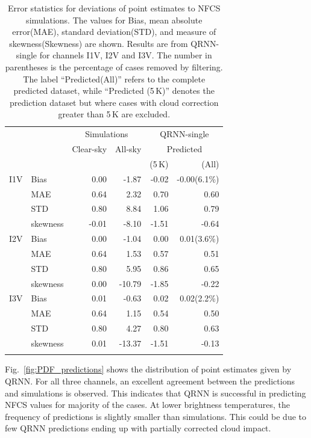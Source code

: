 \documentclass[amt, manuscript]{copernicus}
\begin{document}
\begin{table}[t]
	\caption{ Error statistics for deviations of point estimates to NFCS simulations. 
		The values for Bias, mean absolute error(MAE), standard deviation(STD), and measure of skewness(Skewness) are shown. Results are from QRNN-single for channels I1V, I2V and I3V. The number in parentheses is the percentage of cases removed by filtering. The label ``Predicted(All)'' refers to the complete predicted dataset, while ``Predicted (5\,K)'' denotes the prediction dataset but where cases with cloud correction greater than 5\,K are excluded.}
	\label{tab:error_statistics_ici}
	\begin{tabular}{llrr|rr}
		\tophline
		&&\multicolumn{2}{c|}{Simulations}& \multicolumn{2}{c}{QRNN-single} \\
		\cline{3-6}
		&&Clear-sky &   All-sky &  \multicolumn{2}{c}{Predicted}  \\
		&&			   &			&	(5\,K) & (All) \\
		\middlehline
		
		I1V&  Bias      &  0.00 & -1.87 & -0.02 & -0.00(6.1\%)  \\
		&MAE       &  0.64 &  2.32 &  0.70 &  0.60   \\
		&STD       &  0.80 &  8.84 &  1.06 &  0.79   \\
		&skewness & -0.01 & -8.10 & -1.51 & -0.64  \\
		\middlehline
		I2V & Bias      & 0.00 &  -1.04 &  0.00 &  0.01(3.6\%)  \\
		&MAE       & 0.64 &   1.53 &  0.57 &  0.51 \\
		&STD       & 0.80 &   5.95 &  0.86 &  0.65 \\
		&skewness & 0.00 & -10.79 & -1.85 & -0.22  \\
		\middlehline	
		I3V & Bias      & 0.01 &  -0.63 &  0.02 &  0.02(2.2\%)  \\
		&MAE       & 0.64 &   1.15 &  0.54 &  0.50  \\
		&STD       & 0.80 &   4.27 &  0.80 &  0.63  \\
		&skewness & 0.01 & -13.37 & -1.51 & -0.13  \\
		\bottomhline
	\end{tabular}
	\belowtable{} %
\end{table}

Fig.~\ref{fig:PDF_predictions} shows the distribution of point estimates given by QRNN. For all three channels, an excellent agreement between the predictions and simulations is observed. This indicates that QRNN is successful in predicting NFCS values for majority of the cases. At lower brightness temperatures, the frequency of predictions is slightly smaller than simulations. This could be due to few QRNN predictions ending up with partially corrected cloud impact. 
\end{document}
